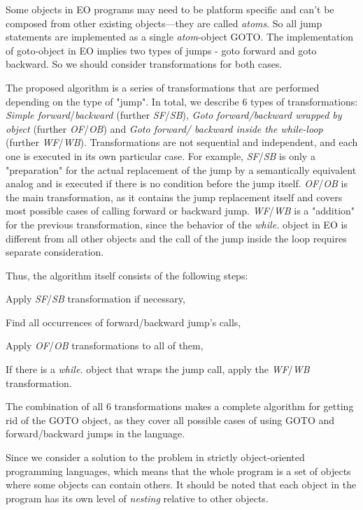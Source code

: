 \documentclass[sigplan,review,11pt,nonacm,natbib=false]{acmart}
\begin{document}
Some objects in EO programs may need to be platform specific and can’t be composed from other existing objects—they are called \emph{atoms}. 
So all jump statements are implemented as a
single \emph{atom}-object GOTO. The implementation of goto-object in EO implies two types of jumps - goto forward and goto backward. So we should consider transformations for both cases.

The proposed algorithm is a series of transformations that are performed depending on the type of "jump".
In total, we describe 6 types of transformations: \emph{Simple forward}/\emph{backward} (further \emph{SF}/\emph{SB}), \emph{Goto forward/backward wrapped by object} (further \emph{OF}/\emph{OB}) and \emph{Goto forward/ backward inside the while-loop} (further \emph{WF}/\emph{WB}).
Transformations are not sequential and independent, and each one is executed in its own particular case.
For example, \emph{SF}/\emph{SB} is only a "preparation" for the actual replacement of the jump by a semantically equivalent analog and is executed if there is no condition before the jump itself.
\emph{OF}/\emph{OB} is the main transformation, as it contains the jump replacement itself and covers most possible cases of calling forward or backward jump.
\emph{WF}/\emph{WB} is a "addition" for the previous transformation, since the behavior of the \emph{while.} object in EO is different from all other objects and the call of the jump inside the loop requires separate consideration.

Thus, the algorithm itself consists of the following steps: 
\begin{inparaenum}[1)]
\item Apply \emph{SF}/\emph{SB} transformation if necessary,
\item Find all occurrences of forward/backward jump's calls,
\item Apply \emph{OF}/\emph{OB} transformations to all of them,
\item If there is a \emph{while.} object that wraps the jump call, apply the \emph{WF}/\emph{WB} transformation.
\end{inparaenum}

The combination of all 6 transformations makes a complete algorithm for getting rid of the GOTO object, as they cover all possible cases of using GOTO and forward/backward jumps in the language.

Since we consider a solution to the problem in strictly object-oriented programming languages, which means that the whole program is a set of objects where some objects can contain others.
It should be noted that each object in the program has its own level of \emph{nesting} relative to other objects.
\end{document}
